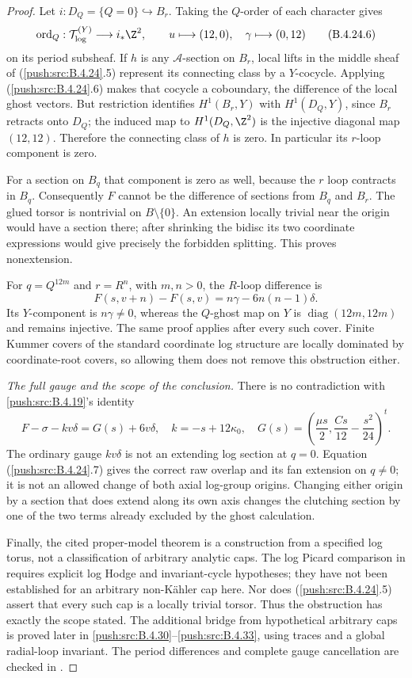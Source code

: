 \begin{proof}
Let $i:D_Q=\{Q=0\}\hookrightarrow B_r$.
Taking the $Q$-order of each character gives
\[
 \operatorname{ord}_Q:
 \mathcal T_{\log}^{(Y)}\longrightarrow i_*\Z^2,
 \qquad
 u\longmapsto(12,0),\quad
 \gamma\longmapsto(0,12)
 \tag{B.4.24.6}
\]
on its period subsheaf. If $h$ is any
$\mathcal A$-section on $B_r$, local lifts in
the middle sheaf of (\ref{push:src:B.4.24}.5) represent its
connecting class by a $Y$-cocycle. Applying
(\ref{push:src:B.4.24}.6) makes that cocycle a coboundary,
the difference of the local ghost vectors.
But restriction identifies $H^1(B_r,Y)$ with
$H^1(D_Q,Y)$, since $B_r$ retracts onto $D_Q$;
the induced map to $H^1(D_Q,\Z^2)$ is the
injective diagonal map $(12,12)$. Therefore
the connecting class of $h$ is zero. In
particular its $r$-loop component is zero.

For a section on $B_q$ that component is zero
as well, because the $r$ loop contracts in $B_q$.
Consequently $F$ cannot be the difference of
sections from $B_q$ and $B_r$. The glued torsor
is nontrivial on $B\setminus\{0\}$. An extension
locally trivial near the origin would have a
section there; after shrinking the bidisc its
two coordinate expressions would give precisely
the forbidden splitting. This proves nonextension.

For $q=Q^{12m}$ and $r=R^n$, with $m,n>0$,
the $R$-loop difference is
\[
 F(s,v+n)-F(s,v)
    =n\gamma-6n(n-1)\delta.
\]
Its $Y$-component is $n\gamma\ne0$,
whereas the $Q$-ghost map on $Y$ is
$\operatorname{diag}(12m,12m)$ and remains
injective. The same proof applies after every
such cover. Finite Kummer covers of the standard
coordinate log structure are locally dominated
by coordinate-root covers, so allowing them
does not remove this obstruction either.

\emph{The full gauge and the scope of the conclusion.}
There is no contradiction with \ref{push:src:B.4.19}'s identity
\[
 F-\sigma-kv\delta=G(s)+6v\delta,
 \quad k=-s+12\kappa_0,
 \quad G(s)=\left(\frac{\mu s}2,
                  \frac{Cs}{12}-\frac{s^2}{24}\right)^t.
 \tag{B.4.24.7}
\]
The ordinary gauge $kv\delta$ is not an extending
log section at $q=0$. Equation (\ref{push:src:B.4.24}.7) gives
the correct raw overlap and its fan extension
on $q\ne0$; it is not an allowed change of
both axial log-group origins. Changing either
origin by a section that does extend along its
own axis changes the clutching section by one
of the two terms already excluded by the
ghost calculation.

Finally, the cited proper-model theorem is a
construction from a specified log torus, not
a classification of arbitrary analytic caps.
The log Picard comparison in
\citet[Sections 7--9]{KKN2008PicardE} requires
explicit log Hodge and invariant-cycle hypotheses;
they have not been established for an arbitrary
non-K\"ahler cap here. Nor does (\ref{push:src:B.4.24}.5)
assert that every such cap is a locally trivial
torsor. Thus the obstruction has exactly the
scope stated. The additional bridge from hypothetical
arbitrary caps is proved later in \ref{push:src:B.4.30}--\ref{push:src:B.4.33},
using traces and a global radial-loop invariant.
The period differences and complete
gauge cancellation are checked in
.
\end{proof}
